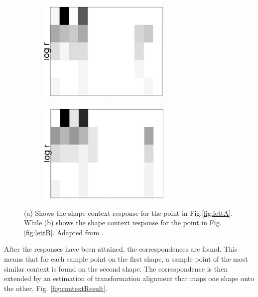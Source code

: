 \begin{figure}[h]
        \centering
        \begin{subfigure}[b]{0.36\textwidth}
                \centering
                \includegraphics[width=0.7\textwidth]{figures/LitreatureReview/responsea.png}
                \caption{}
        \end{subfigure}
        \begin{subfigure}[b]{0.36\textwidth}
                \centering
                \includegraphics[width=0.7\textwidth]{figures/LitreatureReview/responseb.png}
                \caption{}
        \end{subfigure}
        \caption[Shape context result for two points from two similar shapes]{(a) Shows the shape context response for the point in Fig.\ref{fig:lettA}. While (b) shows the shape context response for the point in Fig.\ref{fig:lettB}. Adapted from \cite{context}.}
        \label{fig:contextPart3}
\end{figure}



After the responses have been attained, the correspondences are found. This means that for each sample point on the first shape, a sample point of the most similar context is found on the second shape. The correspondence is then extended by an estimation of transformation alignment that maps one shape onto the other, Fig. \ref{fig:contextResult}.


